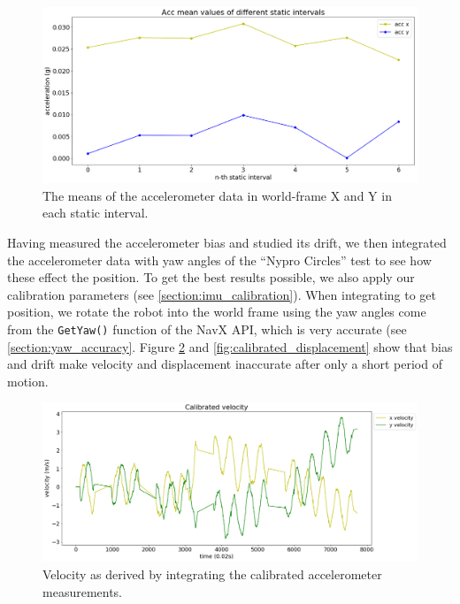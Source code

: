 \documentclass{article}
\begin{document}
      \begin{figure}[H]
        \centering
        \includegraphics[width=1\linewidth]{./images/static_means.png}
        \caption{The means of the accelerometer data in world-frame X and Y in each static interval.}
        \label{fig:static_means}
      \end{figure}

      Having measured the accelerometer bias and studied its drift, we then integrated the accelerometer data with yaw angles of the ``Nypro Circles'' test to see how these effect the position. To get the best results possible, we also apply our calibration parameters (see \ref{section:imu_calibration}). When integrating to get position, we rotate the robot into the world frame using the yaw angles come from the \texttt{GetYaw()} function of the NavX API, which is very accurate (see \ref{section:yaw_accuracy}. Figure \ref{fig:calibrated_velocity} and \ref{fig:calibrated_displacement} show that bias and drift make velocity and displacement inaccurate after only a short period of motion.

      \begin{figure}[H]
        \centering
        \includegraphics[width=1\linewidth]{./images/calibrated_velocity.png}
        \caption{Velocity as derived by integrating the calibrated accelerometer measurements.}
        \label{fig:calibrated_velocity}
      \end{figure}
\end{document}
